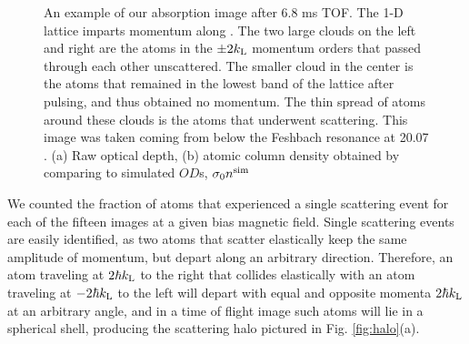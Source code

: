 \documentclass[12pt]{iopart}
\begin{document}
\begin{figure}
\caption{An example of our absorption image after 6.8 ms TOF. The 1-D lattice imparts momentum along \ex{}. The two large clouds on the left and right are the atoms in the $\pm 2 k_{\rm{L}}$ momentum orders that passed through each other unscattered. The smaller cloud in the center is the atoms that remained in the lowest band of the lattice after pulsing, and thus obtained no momentum. The thin spread of atoms around these clouds is the atoms that underwent scattering.   This image was taken coming from below the Feshbach resonance at 20.07  \mT{}. (a) Raw optical depth, (b) atomic column density obtained by comparing to simulated $OD$s, $\sigma_0 n^{\rm{sim}}$ }
\label{fig:SampleCorrection}
\end{figure}

We counted the fraction of atoms that experienced a single scattering event for each of the fifteen images at a given bias magnetic field. Single scattering events are easily identified, as two atoms that scatter elastically keep the same amplitude of momentum, but depart along an arbitrary direction. Therefore, an atom traveling at $2 \hbar k_{\rm{L}}$ to the right that collides elastically with an atom traveling at $-2 \hbar k_{\rm{L}}$ to the left will depart with equal and opposite momenta $2 \hbar k_{\rm{L}}$ at an arbitrary angle, and in a time of flight image such atoms will lie in a spherical shell, producing the scattering halo pictured in Fig. \ref{fig:halo}(a).
\end{document}
